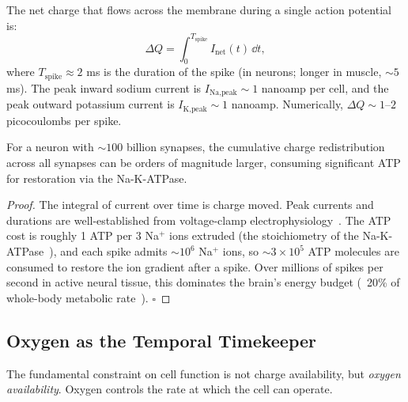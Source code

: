 \begin{theorem}
\label{thm:charge-movement}
The net charge that flows across the membrane during a single action potential is:
\begin{equation}
  \Delta Q = \int_0^{T_{\text{spike}}} I_{\text{net}}(t) \, \dd t,
\end{equation}
where $T_{\text{spike}} \approx 2$ ms is the duration of the spike (in neurons; longer in muscle, $\sim 5$ ms). The peak inward sodium current is $I_{\text{Na,peak}} \sim 1$ nanoamp per cell, and the peak outward potassium current is $I_{\text{K,peak}} \sim 1$ nanoamp. Numerically, $\Delta Q \sim 1$--$2$ picocoulombs per spike.

For a neuron with $\sim 100$ billion synapses, the cumulative charge redistribution across all synapses can be orders of magnitude larger, consuming significant ATP for restoration via the Na-K-ATPase.
\end{theorem}

\begin{proof}
The integral of current over time is charge moved. Peak currents and durations are well-established from voltage-clamp electrophysiology~\cite{HodgkinHuxley1952}. The ATP cost is roughly 1 ATP per 3 Na$^+$ ions extruded (the stoichiometry of the Na-K-ATPase~\cite{YvesMartin1987}), and each spike admits $\sim 10^{6}$ Na$^+$ ions, so $\sim 3 \times 10^{5}$ ATP molecules are consumed to restore the ion gradient after a spike. Over millions of spikes per second in active neural tissue, this dominates the brain's energy budget (~20\% of whole-body metabolic rate~\cite{SalmonAnderson2013}). $\square$
\end{proof}

\subsection{Oxygen as the Temporal Timekeeper}
\label{subsec:oxygen-timekeeper}

The fundamental constraint on cell function is not charge availability, but \emph{oxygen availability}. Oxygen controls the rate at which the cell can operate.

